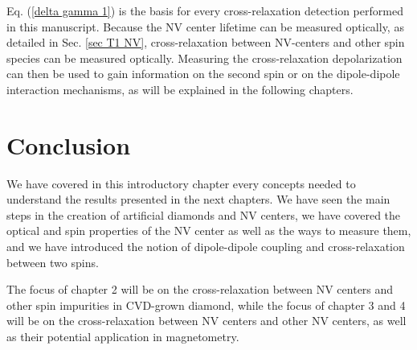 \documentclass[a4paper,11pt]{report}
\begin{document}
\begin{refsection}
Eq. (\ref{delta gamma 1}) is the basis for every cross-relaxation detection performed in this manuscript. Because the NV center lifetime can be measured optically, as detailed in Sec. \ref{sec T1 NV}, cross-relaxation between NV-centers and other spin species can be measured optically. Measuring the cross-relaxation depolarization can then be used to gain information on the second spin or on the dipole-dipole interaction mechanisms, as will be explained in the following chapters.

\section{Conclusion}

We have covered in this introductory chapter every concepts needed to understand the results presented in the next chapters. We have seen the main steps in the creation of artificial diamonds and NV centers, we have covered the optical and spin properties of the NV center as well as the ways to measure them, and we have introduced the notion of dipole-dipole coupling and cross-relaxation between two spins.

The focus of chapter 2 will be on the cross-relaxation between NV centers and other spin impurities in CVD-grown diamond, while the focus of chapter 3 and 4 will be on the cross-relaxation between NV centers and other NV centers, as well as their potential application in magnetometry.
\printbibliography
\end{refsection}
\end{document}
